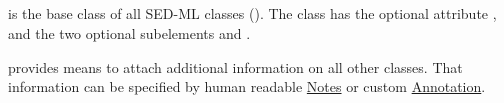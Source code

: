 \subsection{}
\label{class:sedBase}
 is the base class of all SED-ML classes (). The  class has the optional attribute \hyperref[sec:metaid]{}, and the two optional subelements \hyperref[sec:notesElement]{} and \hyperref[sec:annotationElement]{}. 

 provides means to attach additional information on all other classes. That information can be specified by human readable \hyperref[class:notes]{Notes} or custom \hyperref[class:annotation]{Annotation}.

